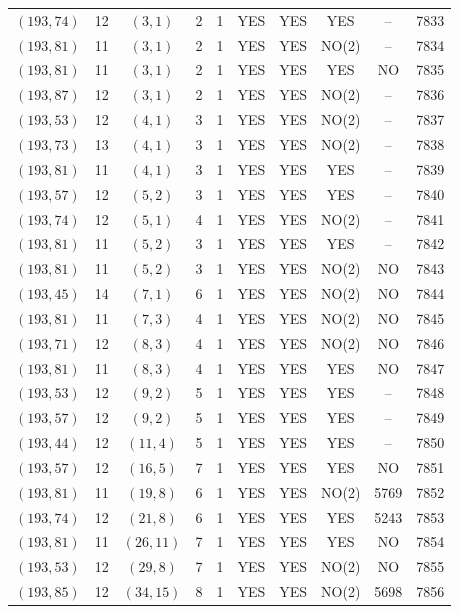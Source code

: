 \begin{longtable}{|c|c|c|c|c|c|c|c|c|c|}
$(193, 74)$ & 12 & $(3, 1)$ & 2 & 1 & YES & YES & YES & -- & 7833\\
$(193, 81)$ & 11 & $(3, 1)$ & 2 & 1 & YES & YES & NO(2) & -- & 7834\\
$(193, 81)$ & 11 & $(3, 1)$ & 2 & 1 & YES & YES & YES & NO & 7835\\
$(193, 87)$ & 12 & $(3, 1)$ & 2 & 1 & YES & YES & NO(2) & -- & 7836\\
$(193, 53)$ & 12 & $(4, 1)$ & 3 & 1 & YES & YES & NO(2) & -- & 7837\\
$(193, 73)$ & 13 & $(4, 1)$ & 3 & 1 & YES & YES & NO(2) & -- & 7838\\
$(193, 81)$ & 11 & $(4, 1)$ & 3 & 1 & YES & YES & YES & -- & 7839\\
$(193, 57)$ & 12 & $(5, 2)$ & 3 & 1 & YES & YES & YES & -- & 7840\\
$(193, 74)$ & 12 & $(5, 1)$ & 4 & 1 & YES & YES & NO(2) & -- & 7841\\
$(193, 81)$ & 11 & $(5, 2)$ & 3 & 1 & YES & YES & YES & -- & 7842\\
$(193, 81)$ & 11 & $(5, 2)$ & 3 & 1 & YES & YES & NO(2) & NO & 7843\\
$(193, 45)$ & 14 & $(7, 1)$ & 6 & 1 & YES & YES & NO(2) & NO & 7844\\
$(193, 81)$ & 11 & $(7, 3)$ & 4 & 1 & YES & YES & NO(2) & NO & 7845\\
$(193, 71)$ & 12 & $(8, 3)$ & 4 & 1 & YES & YES & NO(2) & NO & 7846\\
$(193, 81)$ & 11 & $(8, 3)$ & 4 & 1 & YES & YES & YES & NO & 7847\\
$(193, 53)$ & 12 & $(9, 2)$ & 5 & 1 & YES & YES & YES & -- & 7848\\
$(193, 57)$ & 12 & $(9, 2)$ & 5 & 1 & YES & YES & YES & -- & 7849\\
$(193, 44)$ & 12 & $(11, 4)$ & 5 & 1 & YES & YES & YES & -- & 7850\\
$(193, 57)$ & 12 & $(16, 5)$ & 7 & 1 & YES & YES & YES & NO & 7851\\
$(193, 81)$ & 11 & $(19, 8)$ & 6 & 1 & YES & YES & NO(2) & 5769 & 7852\\
$(193, 74)$ & 12 & $(21, 8)$ & 6 & 1 & YES & YES & YES & 5243 & 7853\\
$(193, 81)$ & 11 & $(26, 11)$ & 7 & 1 & YES & YES & YES & NO & 7854\\
$(193, 53)$ & 12 & $(29, 8)$ & 7 & 1 & YES & YES & NO(2) & NO & 7855\\
$(193, 85)$ & 12 & $(34, 15)$ & 8 & 1 & YES & YES & NO(2) & 5698 & 7856\\

\end{longtable}
